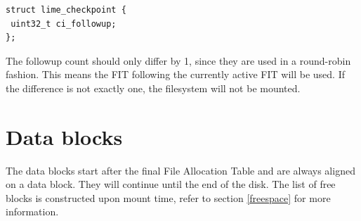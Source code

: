 \begin{verbatim}
struct lime_checkpoint {
 uint32_t ci_followup;
};
\end{verbatim}

The followup count should only differ by 1, since they are used in a round-robin fashion. This means the FIT following the currently active FIT will be used. If the difference is not exactly one, the filesystem will not be mounted.

\section{Data blocks}

The data blocks start after the final File Allocation Table and are always aligned on a data block. They will continue until the end of the disk. The list of free blocks is constructed upon mount time, refer to section \ref{freespace} for more information.

